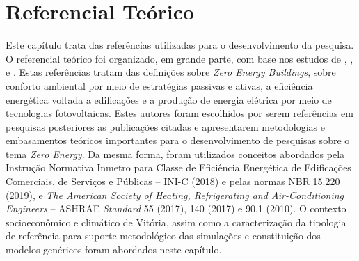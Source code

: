 \section{Referencial Teórico}
\begin{onehalfspace}
    \noindent Este capítulo trata das referências utilizadas para o desenvolvimento da pesquisa. O referencial teórico foi organizado, em grande parte, com base nos estudos de \textcite{Didone2014}, \textcite{Didone2014a}, \textcite{Kurnitski2011a} e \textcite{Torcellini2006}. Estas referências tratam das definições sobre \textit{Zero Energy Buildings}, sobre conforto ambiental por meio de estratégias passivas e ativas, a eficiência energética voltada a edificações e a produção de energia elétrica por meio de tecnologias fotovoltaicas. Estes autores foram escolhidos por serem referências em pesquisas posteriores as publicações citadas e apresentarem metodologias e embasamentos teóricos importantes para o desenvolvimento de pesquisas sobre o tema \textit{Zero Energy}. Da mesma forma, foram utilizados conceitos abordados pela Instrução Normativa Inmetro para Classe de Eficiência Energética de Edificações Comerciais, de Serviços e Públicas – INI-C (2018) e pelas normas NBR 15.220 (2019), e \textit{The American 
    Society of Heating, Refrigerating and Air-Conditioning 
    Engineers} – ASHRAE \textit{Standard} 55 (2017), 140 (2017) e 90.1 (2010). O contexto socioeconômico e climático de Vitória, assim como a caracterização da tipologia de referência para suporte metodológico das simulações e constituição dos modelos genéricos foram abordados neste capítulo.\newline




\end{onehalfspace}